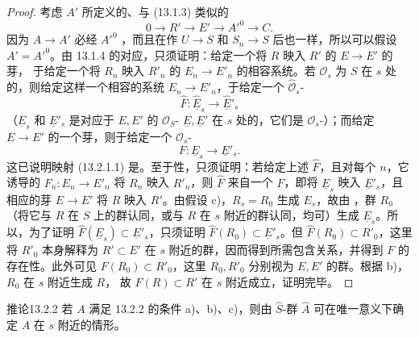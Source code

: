 \begin{proof}
考虑 $A'$ 所定义的、与 (13.1.3) 类似的
\[
 0\longrightarrow R'\longrightarrow E'\longrightarrow A'^0\longrightarrow C.
\]
因为 $A\to A'$ 必经 $A'^0$ ，而且在作 $U\to S$ 和 $S_n\to S$ 后也一样，所以可以假设 $A'=A'^0$。由 13.1.4 的对应，只须证明：给定一个将 $R$ 映入 $R'$ 的 $E\to E'$ 的芽，
于给定一个将 $R_n$ 映入 $R'_n$ 的 $E_n\to E'_n$ 的相容系统。若 $\mathcal O_s$ 为 $S$ 在 $s$ 处的，则给定这样一个相容的系统 $E_n\to E'_n$，于给定一个 $\widehat{\mathcal O}_s$-
\[
 \widehat F:\widehat{\underline E}_s\longrightarrow\widehat{\underline E}'_s
\]
（$\underline E_s$ 和 $\underline E'_s$ 是对应于 $E,E'$ 的 $\mathcal O_S$- $\underline E,\underline E'$ 在 $s$ 处的，它们是 $\mathcal O_s$-）；而给定 $E\to E'$ 的一个芽，则于给定一个 $\mathcal O_s$-
\[
 F:\underline E_s\longrightarrow\underline E'_s.
\]
这已说明映射 (13.2.1.1) 是。至于性，只须证明：若给定上述 $\widehat F$，且对每个 $n$，它诱导的 $F_n:E_n\to E'_n$ 将 $R_n$ 映入 $R'_n$，则 $\widehat F$ 来自一个 $F$，即将 $\underline E_s$ 映入 $\underline E'_s$，且相应的芽 $E\to E'$ 将 $R$ 映入 $R'$。由假设 c)，$R_s=R_0$ 生成 $E_s$，故由 ，群 $R_0$（将它与 $R$ 在 $S$ 上的群认同，或与 $R$ 在 $s$ 附近的群认同，均可）生成 $\underline E_s$。所以，为了证明 $\widehat F(\underline E_s)\subset\underline E'_s$，只须证明 $\widehat F(R_0)\subset\underline E'_s$。但 $\widehat F(R_0)\subset R'_0$，这里将 $R'_0$ 本身解释为 $R'\subset E'$ 在 $s$ 附近的群，因而得到所需包含关系，并得到 $F$ 的存在性。此外可见 $F(R_0)\subset R'_0$，这里 $R_0,R'_0$ 分别视为 $E,E'$ 的群。根据 b)，$R_0$ 在 $s$ 附近生成 $R$，
故 $F(R)\subset R'$ 在 $s$ 附近成立，证明完毕。
\end{proof}

\begin{SGAresult}{推论}{13.2.2}
若 $A$ 满足 13.2.2 的条件 a)、b)、c)，则由 $\widehat S$-群 $\widehat A$ 可在唯一意义下确定 $A$ 在 $s$ 附近的情形。
\end{SGAresult}

